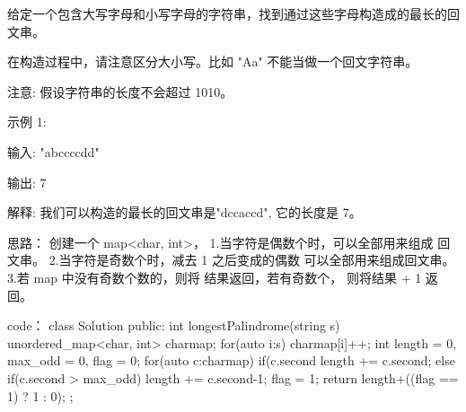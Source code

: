 给定一个包含大写字母和小写字母的字符串，找到通过这些字母构造成的最长的回文串。

在构造过程中，请注意区分大小写。比如 "Aa" 不能当做一个回文字符串。

注意:
假设字符串的长度不会超过 1010。

示例 1:

输入:
"abccccdd"

输出:
7

解释:
我们可以构造的最长的回文串是"dccaccd", 它的长度是 7。



























思路：
创建一个 map<char, int>，
1.当字符是偶数个时，可以全部用来组成 回文串。
2.当字符是奇数个时，减去 1 之后变成的偶数 可以全部用来组成回文串。
3.若 map 中没有奇数个数的，则将 结果返回，若有奇数个， 则将结果 + 1 返回。

























code：
class Solution {
public:
    int longestPalindrome(string s) {
        unordered_map<char, int> charmap;
        for(auto i:s)
            charmap[i]++;
        int length = 0, max_odd = 0, flag = 0;
        for(auto c:charmap)
        {
            if(c.second %
                length += c.second;
            else
            {
                if(c.second > max_odd) length += c.second-1;
                flag = 1;
            }
        }
        return length+((flag == 1) ? 1 : 0);
    }
};